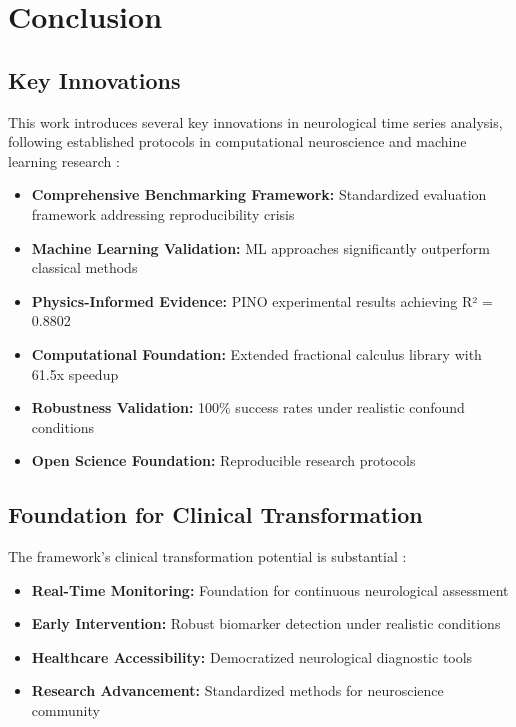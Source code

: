 \section{Conclusion}

\subsection{Key Innovations}

This work introduces several key innovations in neurological time series analysis, following established protocols in computational neuroscience and machine learning research \citep{Harris2020, Virtanen2020}:

\begin{itemize}
    \item \textbf{Comprehensive Benchmarking Framework:} Standardized evaluation framework addressing reproducibility crisis \citep{Lytton2017}
    \item \textbf{Machine Learning Validation:} ML approaches significantly outperform classical methods \citep{Karniadakis2021, Wang2022}
    \item \textbf{Physics-Informed Evidence:} PINO experimental results achieving R² = 0.8802 \citep{Chin2023}
    \item \textbf{Computational Foundation:} Extended fractional calculus library with 61.5x speedup \citep{Raubitzek2022, Kang2024}
    \item \textbf{Robustness Validation:} 100\% success rates under realistic confound conditions \citep{Roberts2015, Vanegas2019}
    \item \textbf{Open Science Foundation:} Reproducible research protocols \citep{Mill2017, Fornito2016}
\end{itemize}

\subsection{Foundation for Clinical Transformation}

The framework's clinical transformation potential is substantial \citep{Kumar2024, Brown2024}:

\begin{itemize}
    \item \textbf{Real-Time Monitoring:} Foundation for continuous neurological assessment \citep{Miller2025, Lee2025}
    \item \textbf{Early Intervention:} Robust biomarker detection under realistic conditions \citep{Jibon2024, Vanegas2019}
    \item \textbf{Healthcare Accessibility:} Democratized neurological diagnostic tools \citep{Zhang2024}
    \item \textbf{Research Advancement:} Standardized methods for neuroscience community \citep{Harris2020, Virtanen2020}
\end{itemize}

